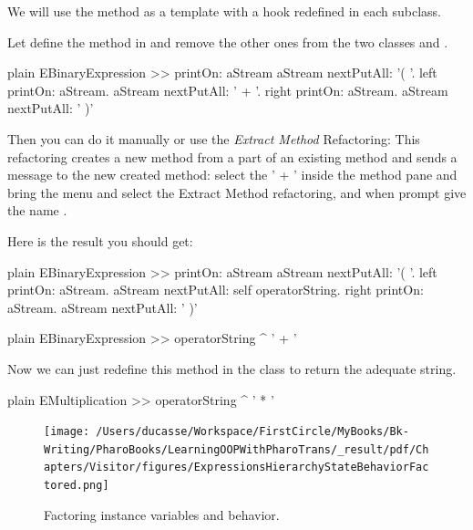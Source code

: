 \documentclass[10pt,twoside,english]{_support/latex/sbabook/sbabook}
\begin{document}
We will use the method  as a template with a hook redefined in each subclass.

Let define the method  in  and remove the other ones from the two classes  and . 

\begin{displaycode}{plain}
EBinaryExpression >> printOn: aStream
	aStream nextPutAll: '( '.
	left printOn: aStream. 
	aStream nextPutAll: ' + '.
	right printOn: aStream.
	aStream nextPutAll: ' )'
\end{displaycode}

Then you can do it manually or use the \textit{Extract Method} Refactoring: This refactoring creates a new method from a part of an existing method and sends a message to the new created method: select the ' + ' inside the method pane and bring the menu and select the Extract Method refactoring, and when prompt give the name . 

Here is the result you should get:  

\begin{displaycode}{plain}
EBinaryExpression >> printOn: aStream
	aStream nextPutAll: '( '.
	left printOn: aStream.
	aStream nextPutAll: self operatorString.
	right printOn: aStream.
	aStream nextPutAll: ' )'
\end{displaycode}

\begin{displaycode}{plain}
EBinaryExpression >> operatorString
	^ ' + '
\end{displaycode}

Now we can just redefine this method in the  class to return the adequate string.

\begin{displaycode}{plain}
EMultiplication >> operatorString
	^ ' * '
\end{displaycode}


\begin{figure}

\begin{center}
\texttt{[image: /Users/ducasse/Workspace/FirstCircle/MyBooks/Bk-Writing/PharoBooks/LearningOOPWithPharoTrans/\_result/pdf/Chapters/Visitor/figures/ExpressionsHierarchyStateBehaviorFactored.png]}\caption{Factoring instance variables and behavior.\label{figExpressionsHierarchyStateBehaviorFactored}}\end{center}
\end{figure}
\end{document}
